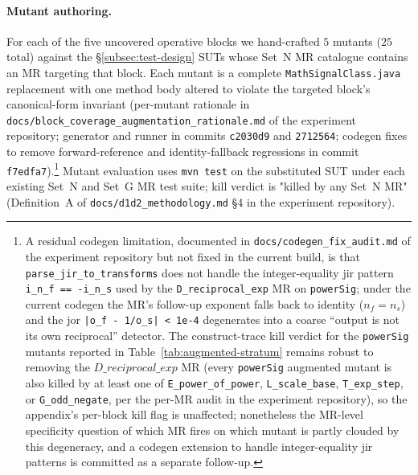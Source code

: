 \paragraph{Mutant authoring.}
For each of the five uncovered operative blocks we hand-crafted $5$
mutants ($25$ total) against the \S\ref{subsec:test-design} SUTs whose
Set~N MR catalogue contains an MR targeting that block. Each mutant
is a complete \texttt{MathSignalClass.java} replacement with one
method body altered to violate the targeted block's canonical-form
invariant (per-mutant rationale in
\texttt{docs/block\_coverage\_augmentation\_rationale.md} of the
experiment repository; generator and runner in commits
\texttt{c2030d9} and \texttt{2712564}; codegen fixes to remove
forward-reference and identity-fallback regressions in commit
\texttt{f7edfa7}).\footnote{A residual codegen limitation, documented
in \texttt{docs/codegen\_fix\_audit.md} of the experiment repository
but not fixed in the current build, is that
\texttt{parse\_jir\_to\_transforms} does not handle the
integer-equality jir pattern \texttt{i\_n\_f == -i\_n\_s} used by the
\texttt{D\_reciprocal\_exp} MR on \texttt{powerSig}; under the
current codegen the MR's follow-up exponent falls back to identity
($n_{f} = n_{s}$) and the jor \texttt{|o\_f - 1/o\_s| < 1e-4}
degenerates into a coarse ``output is not its own reciprocal''
detector. The construct-trace kill verdict for the
\texttt{powerSig} mutants reported in
Table~\ref{tab:augmented-stratum} remains robust to removing the
$D\_reciprocal\_exp$ MR (every \texttt{powerSig} augmented mutant
is also killed by at least one of \texttt{E\_power\_of\_power},
\texttt{L\_scale\_base}, \texttt{T\_exp\_step}, or
\texttt{G\_odd\_negate}, per the per-MR audit in the experiment
repository), so the appendix's per-block kill flag is unaffected;
nonetheless the MR-level specificity question of which MR fires
on which mutant is partly clouded by this degeneracy, and a
codegen extension to handle integer-equality jir patterns is
committed as a separate follow-up.} Mutant evaluation uses \texttt{mvn test} on the
substituted SUT under each existing Set~N and Set~G MR test suite;
kill verdict is "killed by any Set~N MR" (Definition~A of
\texttt{docs/d1d2\_methodology.md} \S4 in the experiment repository).

